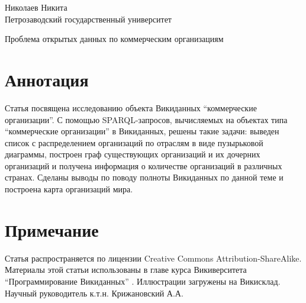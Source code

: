 \begin{center}
	{\normalsize Николаев Никита}
	\\Петрозаводский государственный университет
	
	{\Large \sc Проблема открытых данных по коммерческим организациям }
\end{center}

\section*{Аннотация}

Статья посвящена исследованию объекта Викиданных \enquote{коммерческие организации}. С помощью SPARQL-запросов, вычисляемых на объектах типа \enquote{коммерческие организации} в Викиданных, решены такие задачи: выведен список с распределением организаций по отраслям в виде пузырьковой диаграммы, построен граф существующих организаций и их дочерних организаций и получена информация о количестве организаций в различных странах. Сделаны выводы по поводу полноты Викиданных по данной теме и построена карта организаций мира.


\section*{Примечание}

Статья распространяется по лицензии Creative Commons Attribution-ShareAlike. Материалы этой статьи использованы в главе курса Викиверситета \enquote{Программирование Викиданных} \cite{WDBusinessEnterprise}. Иллюстрации загружены на Викисклад. Научный руководитель к.т.н. Крижановский А.А.